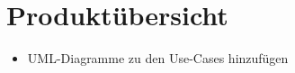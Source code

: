 
\section{Produkt\"ubersicht}

\begin{itemize}
	\item UML-Diagramme zu den Use-Cases hinzufügen
\end{itemize}